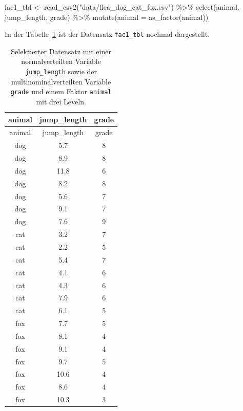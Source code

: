 \documentclass[
  letterpaper,
]{scrbook}
\newenvironment{Shaded}{\begin{snugshade}}{\end{snugshade}}
\newcommand{\AttributeTok}[1]{\textcolor[rgb]{0.40,0.45,0.13}{#1}}
\newcommand{\FunctionTok}[1]{\textcolor[rgb]{0.28,0.35,0.67}{#1}}
\newcommand{\NormalTok}[1]{\textcolor[rgb]{0.00,0.23,0.31}{#1}}
\newcommand{\OtherTok}[1]{\textcolor[rgb]{0.00,0.23,0.31}{#1}}
\newcommand{\SpecialCharTok}[1]{\textcolor[rgb]{0.37,0.37,0.37}{#1}}
\newcommand{\StringTok}[1]{\textcolor[rgb]{0.13,0.47,0.30}{#1}}
\begin{document}
\begin{Shaded}
\begin{Highlighting}[]
\NormalTok{fac1\_tbl }\OtherTok{\textless{}{-}} \FunctionTok{read\_csv2}\NormalTok{(}\StringTok{"data/flea\_dog\_cat\_fox.csv"}\NormalTok{) }\SpecialCharTok{\%\textgreater{}\%}
  \FunctionTok{select}\NormalTok{(animal, jump\_length, grade) }\SpecialCharTok{\%\textgreater{}\%} 
  \FunctionTok{mutate}\NormalTok{(}\AttributeTok{animal =} \FunctionTok{as\_factor}\NormalTok{(animal))}
\end{Highlighting}
\end{Shaded}

In der Tabelle~\ref{tbl-data-posthoc-1} ist der Datensatz
\texttt{fac1\_tbl} nochmal dargestellt.

\hypertarget{tbl-data-posthoc-1}{}
\begin{longtable}[]{@{}ccc@{}}
\caption{\label{tbl-data-posthoc-1}Selektierter Datensatz mit einer
normalverteilten Variable \texttt{jump\_length} sowie der
multinominalverteilten Variable \texttt{grade} und einem Faktor
\texttt{animal} mit drei Leveln.}\tabularnewline
\toprule()
animal & jump\_length & grade \\
\midrule()
\endfirsthead
\toprule()
animal & jump\_length & grade \\
\midrule()
\endhead
dog & 5.7 & 8 \\
dog & 8.9 & 8 \\
dog & 11.8 & 6 \\
dog & 8.2 & 8 \\
dog & 5.6 & 7 \\
dog & 9.1 & 7 \\
dog & 7.6 & 9 \\
cat & 3.2 & 7 \\
cat & 2.2 & 5 \\
cat & 5.4 & 7 \\
cat & 4.1 & 6 \\
cat & 4.3 & 6 \\
cat & 7.9 & 6 \\
cat & 6.1 & 5 \\
fox & 7.7 & 5 \\
fox & 8.1 & 4 \\
fox & 9.1 & 4 \\
fox & 9.7 & 5 \\
fox & 10.6 & 4 \\
fox & 8.6 & 4 \\
fox & 10.3 & 3 \\
\bottomrule()
\end{longtable}
\end{document}

